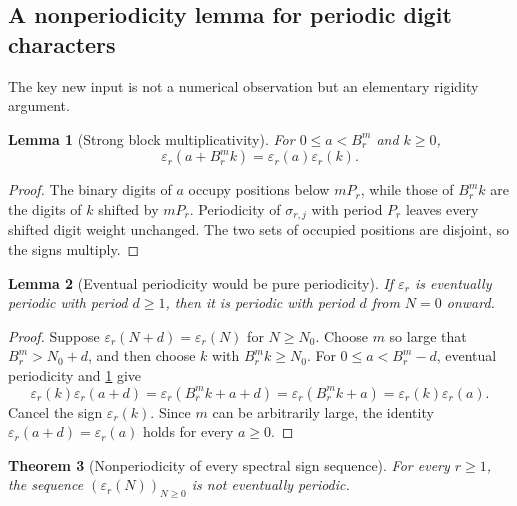 \documentclass[11pt,oneside]{article}
\newtheorem{theorem}{Theorem}[section]
\newtheorem{lemma}[theorem]{Lemma}
\theoremstyle{definition}
\theoremstyle{remark}
\begin{document}
\subsection{A nonperiodicity lemma for periodic digit characters}

The key new input is not a numerical observation but an elementary rigidity
argument.

\begin{lemma}[Strong block multiplicativity]\label{lem:block}
For $0\leq a<B_r^m$ and $k\geq0$,
\begin{equation}\label{eq:block}
 \varepsilon_r(a+B_r^mk)=\varepsilon_r(a)\varepsilon_r(k).
\end{equation}
\end{lemma}

\begin{proof}
The binary digits of $a$ occupy positions below $mP_r$, while those of
$B_r^mk$ are the digits of $k$ shifted by $mP_r$.  Periodicity of
$\sigma_{r,j}$ with period $P_r$ leaves every shifted digit weight unchanged.
The two sets of occupied positions are disjoint, so the signs multiply.
\end{proof}

\begin{lemma}[Eventual periodicity would be pure periodicity]\label{lem:eventual-pure}
If $\varepsilon_r$ is eventually periodic with period $d\geq1$, then it is
periodic with period $d$ from $N=0$ onward.
\end{lemma}

\begin{proof}
Suppose $\varepsilon_r(N+d)=\varepsilon_r(N)$ for $N\geq N_0$.  Choose $m$
so large that $B_r^m>N_0+d$, and then choose $k$ with $B_r^mk\geq N_0$.
For $0\leq a<B_r^m-d$, eventual periodicity and
\cref{lem:block} give
\[
 \varepsilon_r(k)\varepsilon_r(a+d)
 =\varepsilon_r(B_r^mk+a+d)
 =\varepsilon_r(B_r^mk+a)
 =\varepsilon_r(k)\varepsilon_r(a).
\]
Cancel the sign $\varepsilon_r(k)$.  Since $m$ can be arbitrarily large, the
identity $\varepsilon_r(a+d)=\varepsilon_r(a)$ holds for every $a\geq0$.
\end{proof}

\begin{theorem}[Nonperiodicity of every spectral sign sequence]\label{thm:nonperiodic}
For every $r\geq1$, the sequence $(\varepsilon_r(N))_{N\geq0}$ is not
eventually periodic.
\end{theorem}
\end{document}

